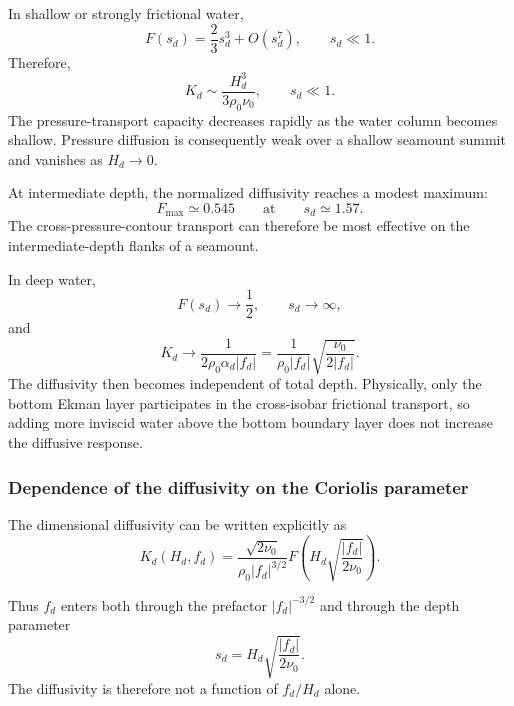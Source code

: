 \documentclass[10pt]{amsart}
\begin{document}
In shallow or strongly frictional water,
\begin{equation}
F(s_d)
=
\frac{2}{3}s_d^3+O(s_d^7),
\qquad
s_d\ll1.
\end{equation}
Therefore,
\begin{equation}
\boxed{
K_d
\sim
\frac{H_d^3}{3\rho_0\nu_0}
},
\qquad
s_d\ll1.
\end{equation}
The pressure-transport capacity decreases rapidly as the water column
becomes shallow. Pressure diffusion is consequently weak over a
shallow seamount summit and vanishes as \(H_d\to0\).

At intermediate depth, the normalized diffusivity reaches a modest
maximum:
\begin{equation}
F_{\max}\simeq0.545
\qquad\text{at}\qquad
s_d\simeq1.57.
\end{equation}
The cross-pressure-contour transport can therefore be most effective
on the intermediate-depth flanks of a seamount.

In deep water,
\begin{equation}
F(s_d)\longrightarrow\frac{1}{2},
\qquad
s_d\longrightarrow\infty,
\end{equation}
and
\begin{equation}
\boxed{
K_d
\longrightarrow
\frac{1}{2\rho_0\alpha_d|f_d|}
=
\frac{1}{\rho_0|f_d|}
\sqrt{\frac{\nu_0}{2|f_d|}}
}.
\end{equation}
The diffusivity then becomes independent of total depth. Physically,
only the bottom Ekman layer participates in the cross-isobar
frictional transport, so adding more inviscid water above the bottom
boundary layer does not increase the diffusive response.


\subsubsection{Dependence of the diffusivity on the Coriolis parameter}

The dimensional diffusivity can be written explicitly as
\begin{equation}
\boxed{
K_d(H_d,f_d)
=
\frac{\sqrt{2\nu_0}}
{\rho_0|f_d|^{3/2}}
F\left(
H_d\sqrt{\frac{|f_d|}{2\nu_0}}
\right)
}.
\end{equation}

Thus \(f_d\) enters both through the prefactor
\(|f_d|^{-3/2}\) and through the depth parameter
\begin{equation}
s_d
=
H_d\sqrt{\frac{|f_d|}{2\nu_0}}.
\end{equation}
The diffusivity is therefore not a function of \(f_d/H_d\) alone.
\end{document}
